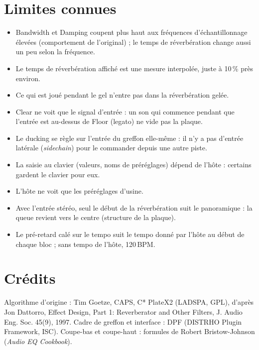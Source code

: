 \documentclass[a4paper,11pt]{article}
\begin{document}
\section{Limites connues}\label{sec:limites}
\begin{itemize}
\item Bandwidth et Damping coupent plus haut aux fréquences d'échantillonnage élevées
  (comportement de l'original) ; le temps de réverbération change aussi un peu selon la
  fréquence.
\item Le temps de réverbération affiché est une mesure interpolée, juste à 10\,\% près environ.
\item Ce qui est joué pendant le gel n'entre pas dans la réverbération gelée.
\item Clear ne voit que le signal d'entrée : un son qui commence pendant que l'entrée est
  au-dessus de Floor (legato) ne vide pas la plaque.
\item Le ducking se règle sur l'entrée du greffon elle-même : il n'y a pas d'entrée latérale
  (\emph{sidechain}) pour le commander depuis une autre piste.
\item La saisie au clavier (valeurs, noms de préréglages) dépend de l'hôte : certains gardent le
  clavier pour eux.
\item L'hôte ne voit que les préréglages d'usine.
\item Avec l'entrée stéréo, seul le début de la réverbération suit le panoramique : la queue
  revient vers le centre (structure de la plaque).
\item Le pré-retard calé sur le tempo suit le tempo donné par l'hôte au début de chaque bloc ;
  sans tempo de l'hôte, 120\,BPM.
\end{itemize}

\section{Crédits}
Algorithme d'origine : Tim Goetze, CAPS, \og C* PlateX2\fg{} (LADSPA, GPL), d'après Jon Dattorro,
\og Effect Design, Part 1: Reverberator and Other Filters\fg, J. Audio Eng. Soc. 45(9), 1997.
Cadre de greffon et interface : DPF (DISTRHO Plugin Framework, ISC). Coupe-bas et coupe-haut : formules
de Robert Bristow-Johnson (\emph{Audio EQ Cookbook}).
\end{document}
